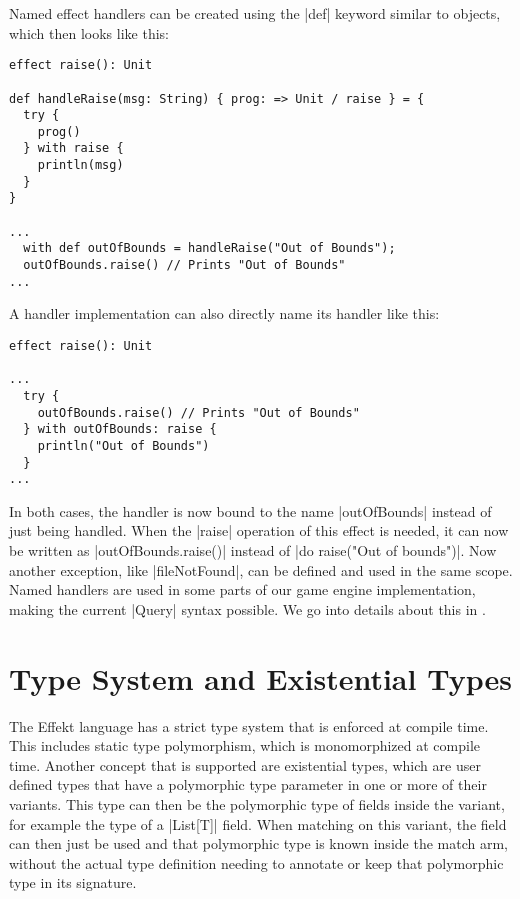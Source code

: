 Named effect handlers can be created using the |def| keyword similar to objects, which then looks like this:

\begin{lstlisting}
effect raise(): Unit

def handleRaise(msg: String) { prog: => Unit / raise } = {
  try {
    prog()
  } with raise {
    println(msg)
  }
}

...
  with def outOfBounds = handleRaise("Out of Bounds");
  outOfBounds.raise() // Prints "Out of Bounds"
...
\end{lstlisting}

A handler implementation can also directly name its handler like this:

\begin{lstlisting}
effect raise(): Unit

...
  try {
    outOfBounds.raise() // Prints "Out of Bounds"
  } with outOfBounds: raise {
    println("Out of Bounds")
  }
...
\end{lstlisting}

In both cases, the handler is now bound to the name |outOfBounds| instead of just being handled. When the |raise| operation of this effect is needed, it can now be written as |outOfBounds.raise()| instead of |do raise("Out of bounds")|. Now another exception, like |fileNotFound|, can be defined and used in the same scope.\\
Named handlers are used in some parts of our game engine implementation, making the current |Query| syntax possible. We go into details about this in .

\section{Type System and Existential Types}

The Effekt language has a strict type system that is enforced at compile time. This includes static type polymorphism, which is monomorphized at compile time. Another concept that is supported are existential types, which are user defined types that have a polymorphic type parameter in one or more of their variants. This type can then be the polymorphic type of fields inside the variant, for example the type of a |List[T]| field. When matching on this variant, the field can then just be used and that polymorphic type is known inside the match arm, without the actual type definition needing to annotate or keep that polymorphic type in its signature.

